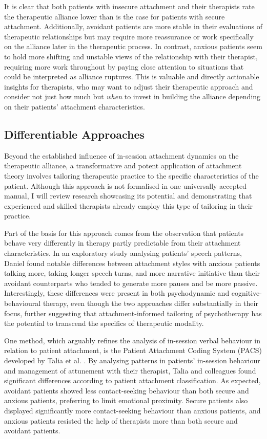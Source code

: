 \documentclass[12pt]{report}
\begin{document}
It is clear that both patients with insecure attachment and their therapists rate the therapeutic alliance lower than is the case for patients with secure attachment.
Additionally, avoidant patients are more stable in their evaluations of therapeutic relationships but may require more reassurance or work specifically on the alliance later in the therapeutic process.
In contrast, anxious patients seem to hold more shifting and unstable views of the relationship with their therapist, requiring more work throughout by paying close attention to situations that could be interpreted as alliance ruptures.
This is valuable and directly actionable insights for therapists, who may want to adjust their therapeutic approach and consider not just how much but \textit{when} to invest in building the alliance depending on their patients' attachment characteristics.

\subsection{Differentiable Approaches}
\label{sec:Differentiable approaches}
Beyond the established influence of in-session attachment dynamics on the therapeutic alliance, a transformative and potent application of attachment theory involves tailoring therapeutic practice to the specific characteristics of the patient.
Although this approach is not formalised in one universally accepted manual, I will review research showcasing its potential and demonstrating that experienced and skilled therapists already employ this type of tailoring in their practice.

Part of the basis for this approach comes from the observation that patients behave very differently in therapy partly predictable from their attachment characteristics.
In an exploratory study analysing patients' speech patterns, Daniel \citeyear{Daniel2011} found notable differences between attachment styles with anxious patients talking more, taking longer speech turns, and more narrative initiative than their avoidant counterparts who tended to generate more pauses and be more passive.
Interestingly, these differences were present in both psychodynamic and cognitive-behavioural therapy, even though the two approaches differ substantially in their focus, further suggesting that attachment-informed tailoring of psychotherapy has the potential to transcend the specifics of therapeutic modality.

One method, which arguably refines the analysis of in-session verbal behaviour in relation to patient attachment, is the Patient Attachment Coding System (PACS) developed by Talia et al. \citeyear{Talia2014, Talia2017}.
By analysing patterns in patients' in-session behaviour and management of attunement with their therapist, Talia and colleagues \citeyear{Talia2014} found significant differences according to patient attachment classification.
As expected, avoidant patients showed less contact-seeking behaviour than both secure and anxious patients, preferring to limit emotional proximity.
Secure patients also displayed significantly more contact-seeking behaviour than anxious patients, and anxious patients resisted the help of therapists more than both secure and avoidant patients.
\end{document}
